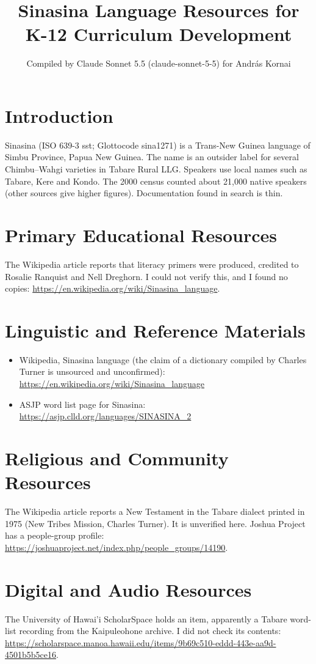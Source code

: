 \documentclass[12pt]{article}
\title{Sinasina Language Resources for K-12 Curriculum Development}
\author{Compiled by Claude Sonnet 5.5 (claude-sonnet-5-5) for Andr\'as Kornai}
\date{}
\begin{document}
\maketitle

\section{Introduction}
Sinasina (ISO 639-3 sst; Glottocode sina1271) is a Trans-New Guinea language of Simbu Province, Papua New Guinea. The name is an outsider label for several Chimbu--Wahgi varieties in Tabare Rural LLG. Speakers use local names such as Tabare, Kere and Kondo. The 2000 census counted about 21,000 native speakers (other sources give higher figures). Documentation found in search is thin.

\section{Primary Educational Resources}
The Wikipedia article reports that literacy primers were produced, credited to Rosalie Ranquist and Nell Dreghorn. I could not verify this, and I found no copies: \url{https://en.wikipedia.org/wiki/Sinasina_language}.

\section{Linguistic and Reference Materials}
\begin{itemize}
\item Wikipedia, Sinasina language (the claim of a dictionary compiled by Charles Turner is unsourced and unconfirmed): \url{https://en.wikipedia.org/wiki/Sinasina_language}
\item ASJP word list page for Sinasina: \url{https://asjp.clld.org/languages/SINASINA_2}
\end{itemize}

\section{Religious and Community Resources}
The Wikipedia article reports a New Testament in the Tabare dialect printed in 1975 (New Tribes Mission, Charles Turner). It is unverified here. Joshua Project has a people-group profile: \url{https://joshuaproject.net/index.php/people_groups/14190}.

\section{Digital and Audio Resources}
The University of Hawai'i ScholarSpace holds an item, apparently a Tabare word-list recording from the Kaipuleohone archive. I did not check its contents: \url{https://scholarspace.manoa.hawaii.edu/items/9b69c510-eddd-443e-aa9d-4501b5b5ce16}.
\end{document}
